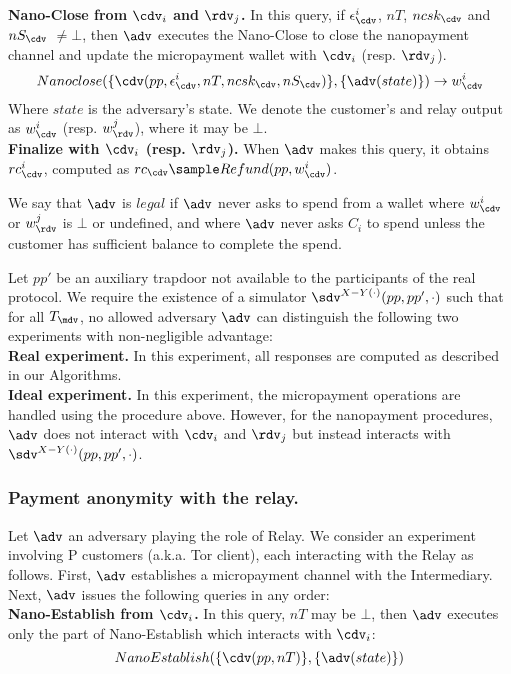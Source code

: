 \textbf{Nano-Close from $\cdv_i$ and $\rdv_j$.} In this query, if $\epsilon^i_\cdv$, $nT$, $ncsk_\cdv$ and $nS_\cdv$ $\neq \bot$, then $\adv$ executes the Nano-Close to close the nanopayment channel and update the micropayment wallet with $\cdv_i$ (resp. $\rdv_j$).
$$Nano\-close(\{\cdv(pp, \epsilon^i_\cdv, nT, ncsk_\cdv, nS_\cdv)\}, \{\adv(state)\}) \rightarrow w^i_\cdv$$
Where $state$ is the adversary's state. We denote the customer's and relay output as $w^i_\cdv$ (resp. $w^j_\rdv$), where it may be $\bot$.\\

\textbf{Finalize with $\cdv_i$ (resp. $\rdv_j$).} When $\adv$ makes this query, it obtains $rc^i_\cdv$, computed as $rc_\cdv \sample Refund(pp, w^i_\cdv)$.

We say that $\adv$ is $legal$ if $\adv$ never asks to spend from a wallet where $w^i_\cdv$ or $w^j_\rdv$ is $\bot$ or undefined, and where $\adv$ never asks $C_i$ to spend unless the customer has sufficient balance to complete the spend.

Let $pp'$ be an auxiliary trapdoor not available to the participants of the real protocol. We require the existence of a simulator $\sdv^{X-Y(\cdot)}(pp, pp', \cdot)$ such that for all $T_\mdv$, no allowed adversary $\adv$ can distinguish the following two experiments with non-negligible advantage:\\
\textbf{Real experiment.} In this experiment, all responses are computed as described in our Algorithms.\\
\textbf{Ideal experiment.} In this experiment, the micropayment operations are handled using the procedure above. However, for the nanopayment procedures, $\adv$ does not interact with $\cdv_i$ and $\rdv_j$ but instead interacts with $\sdv^{X-Y(\cdot)}(pp,pp',\cdot)$.

\subsubsection{Payment anonymity with the relay.}

Let $\adv$ an adversary playing the role of Relay. We consider an experiment involving P customers (a.k.a. Tor client), each interacting with the Relay as follows. First, $\adv$ establishes a micropayment channel with the Intermediary. Next, $\adv$ issues the following queries in any order:\\

\textbf{Nano-Establish from $\cdv_i$.} In this query, $nT$ may be $\bot$, then $\adv$ executes only the part of Nano-Establish which interacts with $\cdv_i$:
$$Nano\-Establish(\{\cdv(pp, nT)\}, \{\adv(state)\})$$

